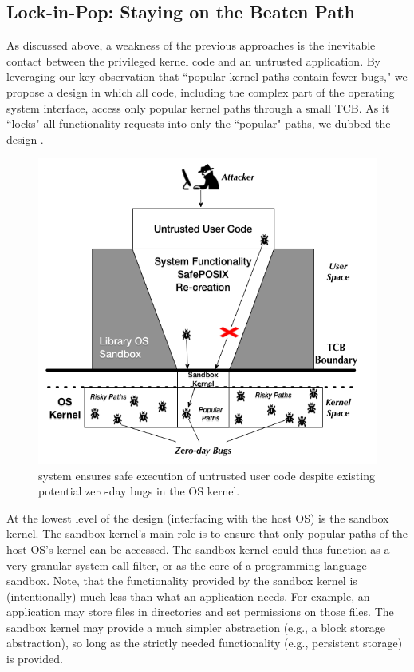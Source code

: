 \subsection{Lock-in-Pop: Staying on the Beaten Path }
As discussed above, a weakness of the previous approaches is the inevitable contact
between the privileged kernel code and an untrusted application.
By leveraging our key observation
that ``popular kernel paths contain fewer bugs," we propose a design
in which all code, including the complex part
of the operating system interface, access only
popular kernel paths through a small TCB. As it ``locks" all functionality
requests into only the ``popular" paths, we dubbed the
design \lip.

\begin{figure}%
\centering
\includegraphics[width=.9\columnwidth]{diagram/Virtualization_Design_Model_01.png}
\caption{\small \lip system ensures safe execution of untrusted user code
despite existing potential zero-day bugs in the OS kernel.}
\label{fig:design_safe_reimplementation}
\end{figure}


At the lowest level of the design (interfacing with the host OS) is the 
sandbox kernel.  The sandbox kernel's main role is to ensure that only
popular paths of the host OS's kernel can be accessed.  The sandbox
kernel could thus function as a very granular system call filter, or
as the core of a programming language sandbox.  Note, that the functionality
provided by the sandbox kernel is (intentionally) much less than what
an application needs.  For example, an application may store files in 
directories and set permissions on those files.  The sandbox kernel may 
provide a much simpler abstraction (e.g., a block storage abstraction), so 
long as the strictly needed functionality (e.g., persistent storage) is
provided.

